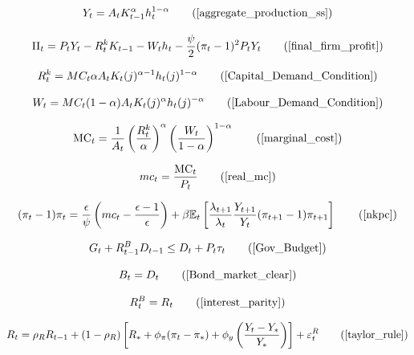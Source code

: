 \documentclass[11pt,preprint]{elsarticle}
\numberwithin{equation}{section}
\numberwithin{figure}{section}
\numberwithin{table}{section}
\begin{document}
\begin{equation}
Y_t = A_t K_{t-1}^\alpha h_t^{1-\alpha}
\tag{\ref{aggregate_production_ss}}
\end{equation}

\begin{equation}
\Pi_t = P_t Y_t - R^k_t K_{t-1} - W_t h_t - \frac{\psi}{2} (\pi_t - 1)^2 P_t Y_t
\tag{\ref{final_firm_profit}}
\end{equation}

\begin{equation}
R_t^k = MC_t \alpha A_t K_t(j)^{\alpha-1} h_t(j)^{1-\alpha}
\tag{\ref{Capital_Demand_Condition}}
\end{equation}

\begin{equation}
W_t = MC_t (1-\alpha) A_t K_t(j)^{\alpha} h_t(j)^{-\alpha}
\tag{\ref{Labour_Demand_Condition}}
\end{equation}

\begin{equation}
\text{MC}_t = \frac{1}{A_t} \left( \frac{R_t^k}{\alpha} \right)^{\alpha} \left( \frac{W_t}{1-\alpha} \right)^{1-\alpha}
\tag{\ref{marginal_cost}}
\end{equation}

\begin{equation}
mc_t = \frac{\text{MC}_t}{P_t}
\tag{\ref{real_mc}}
\end{equation}

\begin{equation}
(\pi_t - 1)\pi_t = \frac{\epsilon}{\psi} \left( mc_t - \frac{\epsilon-1}{\epsilon} \right) + \beta \mathbb{E}_t \left[ \frac{\lambda_{t+1}}{\lambda_t} \frac{Y_{t+1}}{Y_t} (\pi_{t+1} - 1)\pi_{t+1} \right]
\tag{\ref{nkpc}}
\end{equation}

\begin{equation}
G_t + R^B_{t-1} D_{t-1} \leq D_t + P_t \tau_t 
\tag{\ref{Gov_Budget}}
\end{equation}

\begin{equation}
B_t = D_t
\tag{\ref{Bond_market_clear}}
\end{equation}

\begin{equation}
R_t^B = R_t
\tag{\ref{interest_parity}}
\end{equation}

\begin{equation}
R_t = \rho_R R_{t-1} + (1 - \rho_R) \left[ R_* + \phi_\pi (\pi_t - \pi_*) + \phi_y \left( \frac{Y_t - Y_*}{Y_*} \right) \right] + \varepsilon_t^R
\tag{\ref{taylor_rule}}
\end{equation}
\end{document}
